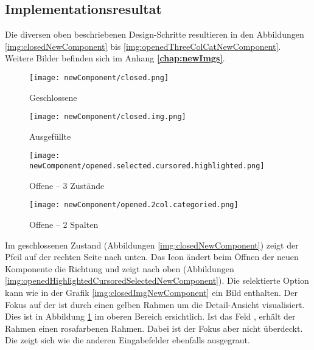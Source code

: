 \subsection{Implementationsresultat}
\label{sec:designImplementation}

Die diversen oben beschriebenen Design-Schritte resultieren in den Abbildungen \ref{img:closedNewComponent} bis \ref{img:openedThreeColCatNewComponent}. 
Weitere Bilder befinden sich im Anhang \textbf{\ref{chap:newImgs}}. 

\begin{figure}[!htb]
    \centering
    \begin{minipage}[b]{0.3\textwidth}
        \centering
        \begin{minipage}[t]{\textwidth}
            \centering
            \texttt{[image: newComponent/closed.png]}
            \caption{\centering Geschlossene }
            \label{img:closedNewComponent}
        \end{minipage}
        \vspace{0.6cm}\newline
        \begin{minipage}[b]{\textwidth}
            \centering
            \texttt{[image: newComponent/closed.img.png]}
            \caption{\centering Ausgefüllte }
            \label{img:closedImgNewComponent}
        \end{minipage}
        \newline
    \end{minipage}
    \hfill
    \begin{minipage}[b]{0.35\textwidth}
        \centering
        \texttt{[image: newComponent/opened.selected.cursored.highlighted.png]}
        \caption{\centering Offene  – 3 Zustände}
        \label{img:openedHighlightedCursoredSelectedNewComponent}
    \end{minipage}
    \hfill
    \begin{minipage}[b]{0.25\textwidth}
        \centering
        \texttt{[image: newComponent/opened.2col.categoried.png]}
        \caption{\centering Offene  – 2 Spalten}
        \label{img:openedTwoColCatNewComponent}
    \end{minipage}
\end{figure}

Im geschlossenen Zustand (Abbildungen \ref{img:closedNewComponent}) zeigt der Pfeil auf der rechten Seite nach unten. 
Das Icon ändert beim Öffnen der neuen Komponente die Richtung und zeigt nach oben (Abbildungen \ref{img:openedHighlightedCursoredSelectedNewComponent}). 
Die selektierte Option kann wie in der Grafik \ref{img:closedImgNewComponent} ein Bild enthalten. 
Der Fokus auf der  ist durch einen gelben Rahmen um die Detail-Ansicht visualisiert. 
Dies ist in Abbildung \ref{img:openedTwoColCatNewComponent} im oberen Bereich ersichtlich. 
Ist das Feld , erhält der Rahmen einen rosafarbenen Rahmen. 
Dabei ist der Fokus aber nicht überdeckt. 
Die   zeigt sich wie die anderen Eingabefelder ebenfalls ausgegraut. 

